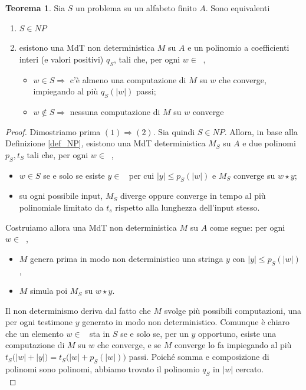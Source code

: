 \documentclass[12pt,a4paper]{report}
\theoremstyle{definition}
\newtheorem{teo}{Teorema}[section]  %
\DeclareMathOperator{\aaa}{\textit{A}^{\star}}
\begin{document}
\begin{teo}\label{teo_caratt_NP}
Sia $S$ un problema su un alfabeto finito $A$. Sono equivalenti
\begin{enumerate}
\item $S \in NP$
\item esistono una MdT non deterministica $M$ su $A$ e un polinomio a coefficienti interi (e valori positivi) $q_S$, tali che, per ogni $w \in \aaa$,
\begin{itemize}
\item $w \in S \Longrightarrow$ c'è almeno una computazione di $M$ su $w$ che converge, impiegando al più $q_S(|w|)$ passi;
\item $w \not\in S\Longrightarrow$ nessuna computazione di $M$ su $w$ converge
\end{itemize}
\end{enumerate}
\begin{proof}
Dimostriamo prima $(1) \Longrightarrow (2)$. Sia quindi $S \in NP$. Allora, in base alla Definizione \ref{def_NP}, esistono una MdT deterministica $M_S$ su $A$ e due polinomi $p_S, t_S$ tali che, per ogni $w \in \aaa$,
\begin{itemize}
\item $w \in S$ se e solo se esiste $y \in \aaa$ per cui $|y| \leq p_S(|w|)$ e $M_S$ converge su $w \star y$;
\item su ogni possibile input, $M_S$ diverge oppure converge in tempo al più polinomiale limitato da $t_s$ rispetto alla lunghezza dell'input stesso.
\end{itemize}
Costruiamo allora una MdT non deterministica $M$ su $A$ come segue: per ogni $w \in \aaa$, 
\begin{itemize}
\item $M$ genera prima in modo non deterministico una stringa $y$ con $|y| \leq p_S(|w|)$,
\item $M$ simula poi $M_S$ su $w \star y$.
\end{itemize}
Il non determinismo deriva dal fatto che $M$ svolge più possibili computazioni, una per ogni testimone $y$ generato in modo non deterministico. Comunque è chiaro che un elemento $w \in \aaa$ sta in $S$ se e solo se, per un $y$ opportuno, esiste una computazione di $M$ su $w$ che converge, e se $M$ converge lo fa impiegando al più $t_S \big( |w|+|y| \big) = t_S \big( |w|+p_S(|w|) \big)$ passi. Poiché somma e composizione di polinomi sono polinomi, abbiamo trovato il polinomio $q_S$ in $|w|$ cercato.\\

\end{proof}
\end{teo}
\end{document}

